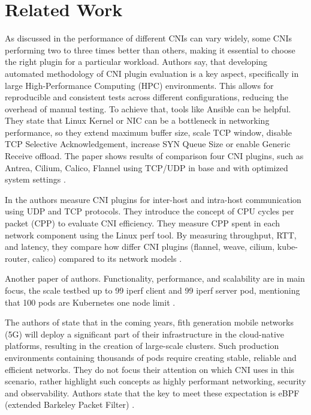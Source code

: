 
\section{Related Work}
\label{sec:realted_work}

As discussed in \cite{dakic2024performance} the performance of different CNIs can vary widely, some CNIs performing two to three times better than others, making it essential to choose the right plugin for a particular workload. Authors say, that developing automated methodology of CNI plugin evaluation is a key aspect, specifically in large High-Performance Computing (HPC) environments. This allows for reproducible and consistent tests across different configurations, reducing the overhead of manual testing. To achieve that, tools like Ansible can be helpful. They state that Linux Kernel or NIC can be a bottleneck in networking performance, so they extend maximum buffer size, scale TCP window, disable TCP Selective Acknowledgement, increase SYN Queue Size or enable Generic Receive offload. The paper shows results of comparison four CNI plugins, such as Antrea, Cilium, Calico, Flannel using TCP/UDP in base and with optimized system settings \cite{dakic2024performance}. 

In \cite{9153266} the authors measure CNI plugins for inter-host and intra-host communication using UDP and TCP protocols. They introduce the concept of CPU cycles per packet (CPP) to evaluate CNI efficiency. They measure CPP spent in each network component using the Linux perf tool. By measuring throughput, RTT, and latency, they compare how differ CNI plugins (flannel, weave, cilium, kube-router, calico) compared to its network models \cite{9153266}. 

Another paper \cite{9309003} of \cite{9153266} authors. Functionality, performance, and scalability are in main focus, the scale testbed up to 99 iperf client and 99 iperf server pod, mentioning that 100 pods are Kubernetes one node limit \cite{9309003}. 

The authors of \cite{10138542} state that in the coming years, fith generation mobile networks (5G) will deploy a significant part of their infrastructure in the cloud-native platforms, resulting in the creation of large-scale clusters. Such production environments containing thousands of pods require creating stable, reliable and efficient networks. They do not focus their attention on which CNI uses in this scenario, rather highlight such concepts as highly performant networking, security and observability. Authors state that the key to meet these expectation is eBPF (extended Barkeley Packet Filter) \cite{10138542}. 
